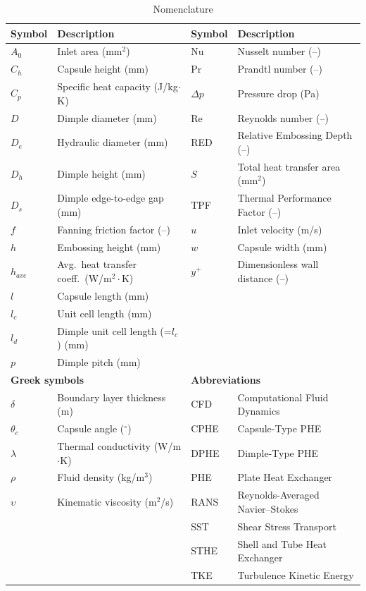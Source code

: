 \documentclass[review,12pt]{elsarticle}
\newcommand{\degree}{\ensuremath{^\circ}}
\begin{document}
\linenumbers

\begin{table}[H]
\caption{Nomenclature}
\centering
\scriptsize
\renewcommand{\arraystretch}{1.05}
\begin{tabular}{@{}ll@{\quad}ll@{}}
\hline
\textbf{Symbol} & \textbf{Description} & \textbf{Symbol} & \textbf{Description} \\
\hline
$A_0$       & Inlet area (mm$^2$) & Nu          & Nusselt number (--) \\
$C_h$       & Capsule height (mm) & Pr          & Prandtl number (--) \\
$C_p$       & Specific heat capacity (J/kg$\cdot$K) & $\Delta p$  & Pressure drop (Pa) \\
$D$         & Dimple diameter (mm) & Re          & Reynolds number (--) \\
$D_e$       & Hydraulic diameter (mm) & RED         & Relative Embossing Depth (--) \\
$D_h$       & Dimple height (mm) & $S$         & Total heat transfer area (mm$^2$) \\
$D_s$       & Dimple edge-to-edge gap (mm) & TPF         & Thermal Performance Factor (--) \\
$f$         & Fanning friction factor (--) & $u$         & Inlet velocity (m/s) \\
$h$         & Embossing height (mm) & $w$         & Capsule width (mm) \\
$h_{ave}$   & Avg.\ heat transfer coeff.\ (W/m$^2\cdot$K) & $y^+$       & Dimensionless wall distance (--) \\
$l$         & Capsule length (mm) & ~ & ~ \\
$l_c$       & Unit cell length (mm) & ~ & ~ \\
$l_d$       & Dimple unit cell length (=$l_c$) (mm) & ~ & ~ \\
$p$         & Dimple pitch (mm) & ~ & ~ \\
\hline
\multicolumn{2}{l}{\textbf{Greek symbols}} & \multicolumn{2}{l}{\textbf{Abbreviations}} \\
\hline
$\delta$    & Boundary layer thickness (m) & CFD   & Computational Fluid Dynamics \\
$\theta_c$  & Capsule angle (\degree) & CPHE  & Capsule-Type PHE \\
$\lambda$   & Thermal conductivity (W/m$\cdot$K) & DPHE  & Dimple-Type PHE \\
$\rho$      & Fluid density (kg/m$^3$) & PHE   & Plate Heat Exchanger \\
$\upsilon$  & Kinematic viscosity (m$^2$/s) & RANS  & Reynolds-Averaged Navier--Stokes \\
            &                               & SST   & Shear Stress Transport \\
            &                               & STHE  & Shell and Tube Heat Exchanger \\
            &                               & TKE   & Turbulence Kinetic Energy \\
\hline
\end{tabular}
\end{table}
\end{document}
